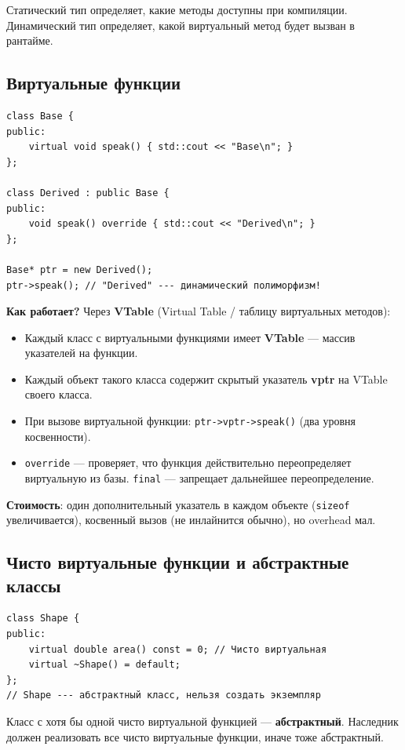 \documentclass[12pt,a4paper]{article}
\begin{document}
Статический тип определяет, какие методы доступны при компиляции.
Динамический тип определяет, какой виртуальный метод будет вызван в рантайме.

\subsection{Виртуальные функции}

\begin{lstlisting}
class Base {
public:
    virtual void speak() { std::cout << "Base\n"; }
};

class Derived : public Base {
public:
    void speak() override { std::cout << "Derived\n"; }
};

Base* ptr = new Derived();
ptr->speak(); // "Derived" --- динамический полиморфизм!
\end{lstlisting}

\textbf{Как работает?} Через \textbf{VTable} (Virtual Table / таблицу виртуальных методов):
\begin{itemize}
    \item Каждый класс с виртуальными функциями имеет \textbf{VTable} --- массив указателей на функции.
    \item Каждый объект такого класса содержит скрытый указатель \textbf{vptr} на VTable своего класса.
    \item При вызове виртуальной функции: \texttt{ptr->vptr->speak()} (два уровня косвенности).
    \item \texttt{override} --- проверяет, что функция действительно переопределяет виртуальную из базы. \texttt{final} --- запрещает дальнейшее переопределение.
\end{itemize}

\textbf{Стоимость}: один дополнительный указатель в каждом объекте (\texttt{sizeof} увеличивается), косвенный вызов (не инлайнится обычно), но overhead мал.

\subsection{Чисто виртуальные функции и абстрактные классы}

\begin{lstlisting}
class Shape {
public:
    virtual double area() const = 0; // Чисто виртуальная
    virtual ~Shape() = default;
};
// Shape --- абстрактный класс, нельзя создать экземпляр
\end{lstlisting}

Класс с хотя бы одной чисто виртуальной функцией --- \textbf{абстрактный}. Наследник должен реализовать все чисто виртуальные функции, иначе тоже абстрактный.
\end{document}
